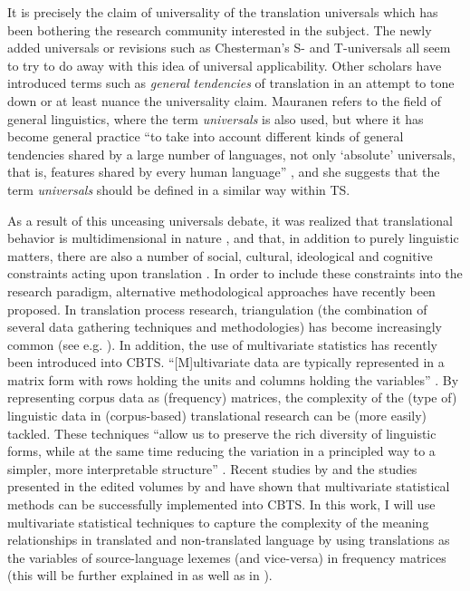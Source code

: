 It is precisely the claim of universality of the translation universals which has been bothering the research community interested in the subject. The newly added universals or revisions such as Chesterman’s S- and T-universals all seem to try to do away with this idea of universal applicability. Other scholars have introduced terms such as \textit{general} \textit{tendencies} of translation in an attempt to tone down or at least nuance the universality claim. Mauranen refers to the field of general linguistics, where the term \textit{universals} is also used, but where it has become general practice “to take into account different kinds of general tendencies shared by a large number of languages, not only ‘absolute’ universals, that is, features shared by every human language” \citep[35]{anderman_universal_2008}, and she suggests that the term \textit{universals} should be defined in a similar way within TS.

As a result of this unceasing universals debate, it was realized that translational behavior is multidimensional in nature \citep{de_sutter_inevitability_2013}, and that, in addition to purely linguistic matters, there are also a number of social, cultural, ideological and cognitive constraints acting upon translation \citep{baker_role_1999}. In order to include these constraints into the research paradigm, alternative methodological approaches have recently been proposed. In translation process research, triangulation (the combination of several data gathering techniques and methodologies) has become increasingly common (see e.g. \citealt{alves_foreword._2003,carl_triangulating_2010,shreve_integrative_2010}). In addition, the use of multivariate statistics has recently been introduced into CBTS. “[M]ultivariate data are typically represented in a matrix form with rows holding the units and columns holding the variables” \citep[302]{meng_multivariate_2012}. By representing corpus data as (frequency) matrices, the complexity of the (type of) linguistic data in (corpus-based) translational research can be (more easily) tackled. These techniques “allow us to preserve the rich diversity of linguistic forms, while at the same time reducing the variation in a principled way to a simpler, more interpretable structure” \citep[301]{meng_multivariate_2012}. Recent studies by  \citet{DelaereEtAl2012,szmrecsanyi_weakly_2014} and the studies presented in the edited volumes by \citet{oakes_quantitative_2012} and  \citet{DeSutterEtAl2017} have shown that multivariate statistical methods can be successfully implemented into CBTS. In this work, I will use multivariate statistical techniques to capture the complexity of the meaning relationships in translated and non-translated language by using translations as the variables of source-language lexemes (and vice-versa) in frequency matrices (this will be further explained in  as well as in ).

